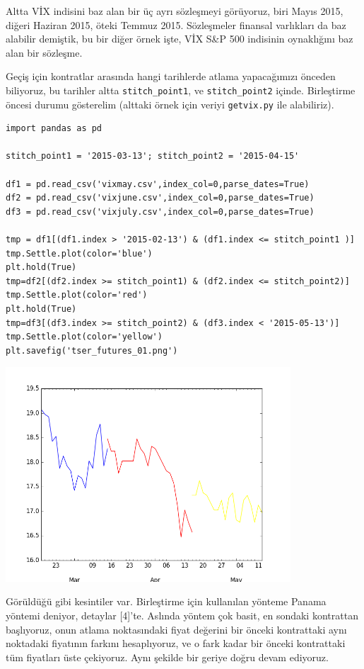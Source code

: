 \documentclass[12pt,fleqn]{article}\usepackage{../../common}
\begin{document}
Altta VİX indisini baz alan bir üç ayrı sözleşmeyi görüyoruz, biri Mayıs 2015,
diğeri Haziran 2015, öteki Temmuz 2015. Sözleşmeler finansal varlıkları da baz
alabilir demiştik, bu bir diğer örnek işte, VİX S\&P 500 indisinin
oynaklığını baz alan bir sözleşme.

Geçiş için kontratlar arasında hangi tarihlerde atlama yapacağımızı önceden
biliyoruz, bu tarihler altta \verb!stitch_point1!, ve \verb!stitch_point2!
içinde. Birleştirme öncesi durumu gösterelim (alttaki örnek için veriyi
\verb!getvix.py!  ile alabiliriz).

\begin{verbatim}
import pandas as pd

stitch_point1 = '2015-03-13'; stitch_point2 = '2015-04-15'

df1 = pd.read_csv('vixmay.csv',index_col=0,parse_dates=True)
df2 = pd.read_csv('vixjune.csv',index_col=0,parse_dates=True)
df3 = pd.read_csv('vixjuly.csv',index_col=0,parse_dates=True)

tmp = df1[(df1.index > '2015-02-13') & (df1.index <= stitch_point1 )]
tmp.Settle.plot(color='blue')
plt.hold(True)
tmp=df2[(df2.index >= stitch_point1) & (df2.index <= stitch_point2)]
tmp.Settle.plot(color='red')
plt.hold(True)
tmp=df3[(df3.index >= stitch_point2) & (df3.index < '2015-05-13')]
tmp.Settle.plot(color='yellow')
plt.savefig('tser_futures_01.png')
\end{verbatim}

\includegraphics[height=8cm]{tser_futures_01.png}

Görüldüğü gibi kesintiler var. Birleştirme için kullanılan yönteme Panama
yöntemi deniyor, detaylar [4]'te. Aslında yöntem çok basit, en sondaki
kontrattan başlıyoruz, onun atlama noktasındaki fiyat değerini bir önceki
kontrattaki aynı noktadaki fiyatının farkını hesaplıyoruz, ve o fark kadar bir
önceki kontrattaki tüm fiyatları üste çekiyoruz. Aynı şekilde bir geriye doğru
devam ediyoruz.
\end{document}
